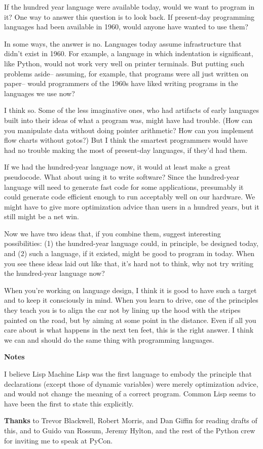 If the hundred year language were available today, would we want to
program in it? One way to answer this question is to look back. If
present-day programming languages had been available in 1960, would
anyone have wanted to use them?

In some ways, the answer is no. Languages today assume infrastructure
that didn't exist in 1960. For example, a language in which indentation
is significant, like Python, would not work very well on printer
terminals. But putting such problems aside-- assuming, for example, that
programs were all just written on paper-- would programmers of the 1960s
have liked writing programs in the languages we use now?

I think so. Some of the less imaginative ones, who had artifacts of
early languages built into their ideas of what a program was, might have
had trouble. (How can you manipulate data without doing pointer
arithmetic? How can you implement flow charts without gotos?) But I
think the smartest programmers would have had no trouble making the most
of present-day languages, if they'd had them.

If we had the hundred-year language now, it would at least make a great
pseudocode. What about using it to write software? Since the
hundred-year language will need to generate fast code for some
applications, presumably it could generate code efficient enough to run
acceptably well on our hardware. We might have to give more optimization
advice than users in a hundred years, but it still might be a net win.

Now we have two ideas that, if you combine them, suggest interesting
possibilities: (1) the hundred-year language could, in principle, be
designed today, and (2) such a language, if it existed, might be good to
program in today. When you see these ideas laid out like that, it's hard
not to think, why not try writing the hundred-year language now?

When you're working on language design, I think it is good to have such
a target and to keep it consciously in mind. When you learn to drive,
one of the principles they teach you is to align the car not by lining
up the hood with the stripes painted on the road, but by aiming at some
point in the distance. Even if all you care about is what happens in the
next ten feet, this is the right answer. I think we can and should do
the same thing with programming languages.

\textbf{Notes}

I believe Lisp Machine Lisp was the first language to embody the
principle that declarations (except those of dynamic variables) were
merely optimization advice, and would not change the meaning of a
correct program. Common Lisp seems to have been the first to state this
explicitly.

\textbf{Thanks} to Trevor Blackwell, Robert Morris, and Dan Giffin for
reading drafts of this, and to Guido van Rossum, Jeremy Hylton, and the
rest of the Python crew for inviting me to speak at PyCon.
